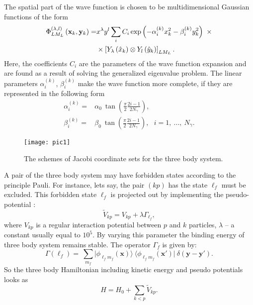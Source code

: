 \documentclass[
12pt, %
oneside, %
english, %
doublespacing, %
doublespacing, %
toctotoc, %
parskip, %
headsepline, %
]{MastersDoctoralThesis} %
\begin{document}
The spatial part of the wave function is chosen to be multidimensional Gaussian functions of the form
\begin{align}
\Phi^{(\lambda,l)}_{LM_L} \left({\bf x}_k, {\bf y}_k \right)=&
x^\lambda y^l 
\sum_i C_i 
\exp\left( - \alpha_i^{(k)} x^2_k - \beta_i^{(k)} y^2_k \right)~
\times \nonumber \\
& \times \left[ 
Y_\lambda \left(\hat{x}_k \right) \otimes Y_l \left(\hat{y}_k \right)
\right]_{LM_L}.
\label{spatial_part}
\end{align}
Here, the coefficients $ C_{i} $ are the parameters of the wave function expansion and are found as a result of solving the generalized eigenvalue problem. 
The linear parameters  $ \alpha^{(k)} _ {i} $, $ \beta^{(k)}_{i}$ 
make the wave function more complete, if they are represented in the following form
\begin{align}
\alpha^{(k)} _ {i} =& \alpha_0~ \tan 
\left( \frac{\pi}{2} \frac{2i-1}{2N_{\gamma}} \right),
  \\
\beta^{(k)} _ {i} =& \beta_0~  \tan 
\left( \frac{\pi}{2} \frac{2i-1}{2N_{\gamma}} \right),
~~~ i=1,~...,~N_{\gamma}.
\end{align}

\begin{figure}[b]
\centering
\texttt{[image: pic1]}
\decoRule
\caption{ The schemes of Jacobi coordinate sets for the three body system.}
\label{fig:jacobiSet}
\end{figure}

A pair of the three body system may have forbidden states according to the principle Pauli. 
For instance, lets say, the pair $(kp)$ has the state $\ell_f$ must be excluded.  
This forbidden state $\ell_f$ is projected out by implementing the pseudo-potential \cite{kukulin1978orthogonal}:
\begin{equation}
\label{pseudopot}
\widetilde{V}_{kp}=V_{kp}+\lambda \Gamma_{\ell_f},
\end{equation}
where $V_{kp}$ is  a regular interaction potential between $p$ and $k$ particles,  $\lambda$ -- a constant usually equal to $10^5$.  By varying this parameter the binding energy of three body system  remains stable. The operator $\Gamma_f$ is given by:
\begin{equation}
\label{projector}
\Gamma(\ell_f)=~
\sum\limits_{m_f}\vert \phi_{\ell_f m_f} ({\mathbf x})\rangle~ 
 \langle  \phi_{\ell_f m_f} ({\mathbf x'}) \vert ~
 \delta({\mathbf y - \mathbf y'}).
\end{equation}
So the three body Hamiltonian including kinetic energy and pseudo potentials looks as
\begin{equation}
\label{pseudohamiltonian}
H=H_0+\sum_{k < p} \widetilde{V }_{kp}.
\end{equation}
\end{document}
